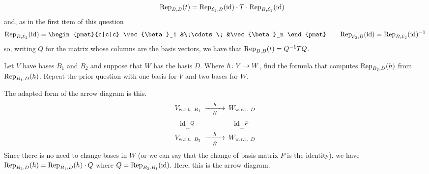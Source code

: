 \begin{exercises}
\begin{answer}
\begin{exparts}
\begin{equation*}
\begin{CD}
            \end{CD}
        \qquad 
            \rep{t}{B,B}=\rep{\identity}{\stdbasis_2,B}
                          \cdot T
                          \cdot \rep{\identity}{B,\stdbasis_2}
          \end{equation*}
          and, as in the first item of this question
          \begin{equation*}
            \rep{\identity}{B,\stdbasis_2}
            =\begin{pmat}{c|c|c}
              \vec{\beta}_1 &\;\cdots\; &\vec{\beta}_n
            \end{pmat}
            \qquad
            \rep{\identity}{\stdbasis_2,B}=\rep{\identity}{B,\stdbasis_2}^{-1}
          \end{equation*}
          so, writing $Q$ for the matrix whose columns are the basis vectors,
          we have that $\rep{t}{B,B}=Q^{-1}TQ$.
      \end{exparts}
    \end{answer}
  \item 
    \begin{exparts}
       \partsitem Let \( V \) have bases \( B_1 \) and \( B_2 \) and 
         suppose that \( W \) has the basis \( D \).
         Where \( \map{h}{V}{W} \), find the formula that computes
         \( \rep{h}{B_2,D} \) from \( \rep{h}{B_1,D} \).
       \partsitem Repeat the prior question with one basis 
         for \( V \) and two bases for \( W \).
     \end{exparts}
     \begin{answer}
       \begin{exparts}
         \partsitem The adapted form of the arrow diagram is this.
           \begin{equation*}
             \begin{CD}
               V_\wrt{B_1}                   @>h>H>        W_\wrt{D}       \\
               @V\scriptstyle\identity VQV      @V\scriptstyle\identity VPV \\
               V_\wrt{B_2}             @>h>\hat{H}>  W_\wrt{D}
             \end{CD}
           \end{equation*}
           Since there is no need to change bases in 
           \( W \) (or we can
           say that the change of basis matrix $P$ is the identity), we have
           \( \rep{h}{B_2,D}=\rep{h}{B_1,D}\cdot Q \) where
           \( Q=\rep{\identity}{B_2,B_1} \).
         \partsitem Here, this is the arrow diagram. 

\end{exparts}
\end{answer}
\end{exercises}
